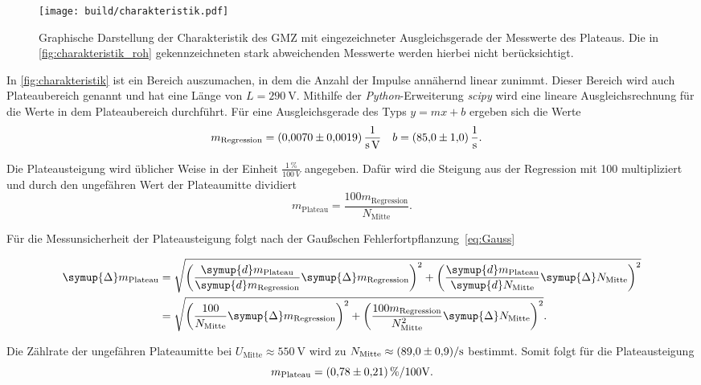 \begin{figure}[H]
    \centering
    \texttt{[image: build/charakteristik.pdf]}
    \caption{Graphische Darstellung der Charakteristik des GMZ mit eingezeichneter Ausgleichsgerade der %
    Messwerte des Plateaus. Die in \autoref{fig:charakteristik_roh} gekennzeichneten stark abweichenden %
    Messwerte werden hierbei nicht berücksichtigt.}
    \label{fig:charakteristik}
\end{figure}

In \autoref{fig:charakteristik} ist ein Bereich auszumachen, in dem die Anzahl der Impulse annähernd linear
zunimmt. Dieser Bereich wird auch Plateaubereich genannt und hat eine Länge von $L=\qty{290}{\volt}$. Mithilfe der \textit{Python}-Erweiterung \textit{scipy} \cite{scipy} wird eine lineare Ausgleichsrechnung
für die Werte in dem Plateaubereich durchführt. Für eine Ausgleichsgerade des Typs $y=mx + b$ ergeben sich die
Werte
\begin{align*}
    m_{\text{Regression}} &= \qty{0.0070+-0.0019}{\per\second\per\volt} & b &= \qty{85.0+-1.0}{\per\second}.
\end{align*}

Die Plateausteigung wird üblicher Weise in der Einheit $\frac{1\,\%}{100\,V}$ angegeben. Dafür wird die Steigung aus der Regression mit 100 multipliziert 
und durch den ungefähren Wert der Plateaumitte dividiert
\begin{equation*}
    m_{\text{Plateau}} = \frac{100 m_{\text{Regression}}}{N_{\text{Mitte}}}.
\end{equation*}

Für die Messunsicherheit der Plateausteigung folgt nach der Gaußschen Fehlerfortpflanzung~\eqref{eq:Gauss}

\begin{align*}
    \symup{\Delta}m_{\text{Plateau}} &= \sqrt{\left(\frac{\symup{d}m_{\text{Plateau}}}{\symup{d}m_{\text{Regression}}}\symup{\Delta} m_{\text{Regression}} \right)^2 + %
     \left(\frac{\symup{d}m_{\text{Plateau}}}{\symup{d}N_{\text{Mitte}}}\symup{\Delta} N_{\text{Mitte}} \right)^2} \\
     &=\sqrt{\left(\frac{100}{N_{\text{Mitte}}}\symup{\Delta} m_{\text{Regression}}\right)^2 + \left(\frac{100 m_{\text{Regression}}}{N_{\text{Mitte}}^2}\symup{\Delta} N_{\text{Mitte}}\right)^2}.
\end{align*}

Die Zählrate der ungefähren Plateaumitte bei $U_{\text{Mitte}}\approx \qty{550}{\volt}$ wird zu $N_{\text{Mitte}} \approx \qty{89+-0.9}{\per\second}$
bestimmt. Somit folgt für die Plateausteigung
\begin{equation*}
    m_{\text{Plateau}} = \qty{0.78+-0.21}{\percent\per100\volt}.
\end{equation*}

